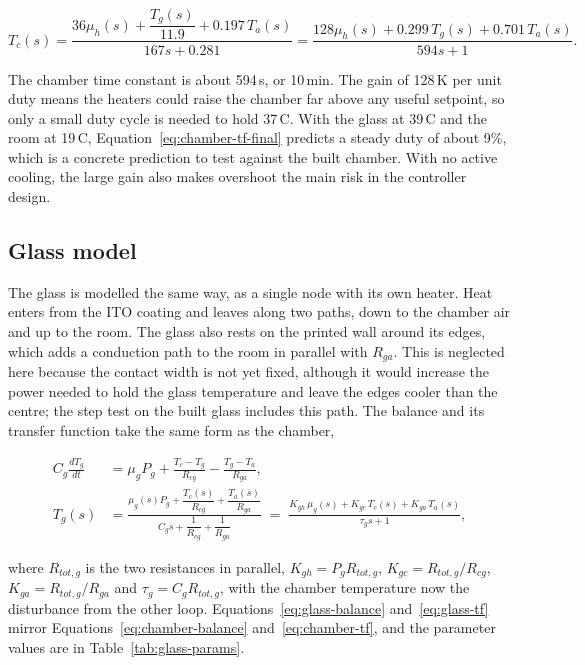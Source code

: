 \begin{equation}
T_c(s) = \frac{36 \mu_h(s) + \dfrac{T_g(s)}{11.9} + 0.197\,T_a(s)}{167s + 0.281} = \frac{128 \mu_h(s) + 0.299\,T_g(s) + 0.701\,T_a(s)}{594s + 1}.
\label{eq:chamber-tf-final}
\end{equation}

The chamber time constant is about 594\,s, or 10\,min. The gain of 128\,K per unit duty means the heaters could raise the chamber far above any useful setpoint, so only a small duty cycle is needed to hold 37\,\textdegree{}C. With the glass at 39\,\textdegree{}C and the room at 19\,\textdegree{}C, Equation~\ref{eq:chamber-tf-final} predicts a steady duty of about 9\%, which is a concrete prediction to test against the built chamber. With no active cooling, the large gain also makes overshoot the main risk in the controller design.

\subsection{Glass model}
\label{subsec:glass-model}

The glass is modelled the same way, as a single node with its own heater. Heat enters from the ITO coating and leaves along two paths, down to the chamber air and up to the room. The glass also rests on the printed wall around its edges, which adds a conduction path to the room in parallel with $R_{ga}$. This is neglected here because the contact width is not yet fixed, although it would increase the power needed to hold the glass temperature and leave the edges cooler than the centre; the step test on the built glass includes this path. The balance and its transfer function take the same form as the chamber,

\begin{align}
C_g \frac{dT_g}{dt} &= \mu_g P_g + \frac{T_c - T_g}{R_{cg}} - \frac{T_g - T_a}{R_{ga}}, \label{eq:glass-balance} \\[4pt]
T_g(s) &= \frac{\mu_g(s) P_g + \dfrac{T_c(s)}{R_{cg}} + \dfrac{T_a(s)}{R_{ga}}}{C_g s + \dfrac{1}{R_{cg}} + \dfrac{1}{R_{ga}}}
\;=\;
\frac{K_{gh}\,\mu_g(s) + K_{gc}\,T_c(s) + K_{ga}\,T_a(s)}{\tau_g s + 1},
\label{eq:glass-tf}
\end{align}

where $R_{tot,g}$ is the two resistances in parallel, $K_{gh} = P_g R_{tot,g}$, $K_{gc} = R_{tot,g}/R_{cg}$, $K_{ga} = R_{tot,g}/R_{ga}$ and $\tau_g = C_g R_{tot,g}$, with the chamber temperature now the disturbance from the other loop. Equations~\ref{eq:glass-balance} and~\ref{eq:glass-tf} mirror Equations~\ref{eq:chamber-balance} and~\ref{eq:chamber-tf}, and the parameter values are in Table~\ref{tab:glass-params}.

